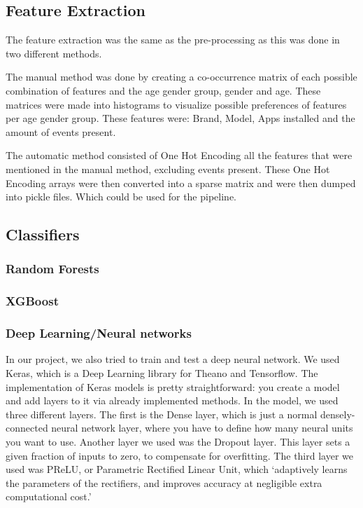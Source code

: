 \documentclass[runningheads,a4paper]{llncs}
\begin{document}
\subsection{Feature Extraction}
The feature extraction was the same as the pre-processing as this was done in two different methods. 

The manual method was done by creating a co-occurrence matrix of each possible combination of features and the age gender group, gender and age. These matrices were made into histograms to visualize possible preferences of features per age gender group. These features were: Brand, Model, Apps installed and the amount of events present.

The automatic method consisted of One Hot Encoding all the features that were mentioned in the manual method, excluding events present. These One Hot Encoding arrays were then converted into a sparse matrix and were then dumped into pickle files. Which could be used for the pipeline. 

\subsection{Classifiers}
\subsubsection{Random Forests}
\subsubsection{XGBoost}
\subsubsection{Deep Learning/Neural networks}

In our project, we also tried to train and test a deep neural network. We used Keras, which is a Deep Learning library for Theano and Tensorflow. The implementation of Keras models is pretty straightforward: you create a model and add layers to it via already implemented methods. In the model, we used three different layers. The first is the Dense layer, which is just a normal densely-connected neural network layer, where you have to define how many neural units you want to use. Another layer we used was the Dropout layer. This layer sets a given fraction of inputs to zero, to compensate for overfitting. The third layer we used was PReLU, or Parametric Rectified Linear Unit, which `adaptively learns the parameters of the rectifiers, and improves accuracy at negligible extra computational cost.' \cite{PReLU}
\end{document}
